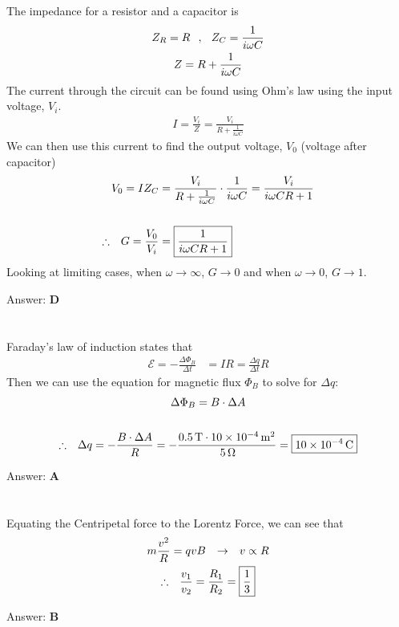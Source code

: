 \documentclass[12pt]{article}
\newcommand{\Answer}[1]{Answer: \textbf{#1}}
\newcommand{\Problem}[3]{
    \setcounter{section}{#1}
    \addtocounter{section}{-1}
    \section{}
    #3\par\par
    \Answer{#2}
}
\begin{document}
\Problem{69}{D}{%
The impedance for a resistor and a capacitor is
\begin{gather}
Z_{R} = R \hspace{.1 in}, \hspace{.1 in} Z_{C} = \frac{1}{i \omega C}\\
Z = R + \frac{1}{i \omega C}\nonumber
\end{gather}
The current through the circuit can be found using Ohm's law using the input voltage, $V_{i}$.
\begin{align}
I = \frac{V_i}{Z} = \frac{V_i}{R + \frac{1}{i \omega C}}\nonumber
\end{align}
We can then use this current to find the output voltage, $V_{0}$ (voltage after capacitor)
\begin{align}
V_{0} = I Z_{C} &= \frac{V_i}{R + \frac{1}{i \omega C}} \cdot \frac{1}{i \omega C} = \frac{V_i}{i \omega C R + 1}\nonumber\\
\nonumber\\
\therefore \hspace{.1in} G = \frac{V_{0}}{V_{i}} &= \boxed{\frac{1}{i \omega C R + 1}}\nonumber
\end{align}
Looking at limiting cases, when $\omega \rightarrow \infty$, $G \rightarrow 0$ and when $\omega \rightarrow 0$, $G \rightarrow 1$.
}

\Problem{70}{A}{%
Faraday's law of induction states that
\begin{align}
\mathcal{E} =
-\frac{\Delta \Phi_{B}}{\Delta t} &=
IR =
\frac{\Delta q}{\Delta t} R
\end{align}
Then we can use the equation for magnetic flux $\Phi_{B}$ to solve for $\Delta q$:
\begin{gather}
\Delta \Phi_{B} = B \cdot \Delta A\\
\nonumber\\
\therefore \hspace{.1in} \Delta q =
-\frac{B \cdot \Delta A}{R} =
-\frac{0.5\,\text{T} \cdot 10\times 10^{-4}\,\text{m$^{2}$}}{\, 5\,\text{$\Omega$}} =
\boxed{10\times 10^{-4}\,\text{C}}\nonumber
\end{gather}
}

\Problem{71}{B}{%
Equating the Centripetal force to the Lorentz Force, we can see that
\begin{gather}
m \frac{v^{2}}{R} = qvB \hspace{.1in} \rightarrow \hspace{.1in} v \propto R\\
\therefore \hspace{.1in} \frac{v_{1}}{v_{2}} = \frac{R_{1}}{R_{2}} = \boxed{\frac{1}{3}}\nonumber
\end{gather}
}
\end{document}
